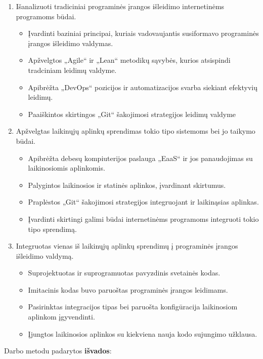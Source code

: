 \documentclass{VUMIFPSkursinis}
\begin{document}
\begin{enumerate}
  \item Išanalizuoti tradiciniai programinės įrangos išleidimo internetinėms programoms būdai.
    \begin{itemize}
      \item Įvardinti baziniai principai, kuriais vadovaujantis susiformavo programinės įrangos išleidimo valdymas.
      \item Apžvelgtos „Agile“ ir „Lean“ metodikų sąvybės, kurios atsispindi tradciniam leidimų valdyme.
      \item Apibrėžta „DevOps“ pozicijos ir automatizacijos svarba siekiant efektyvių leidimų.
      \item Paaiškintos skirtingos „Git“ šakojimosi strategijos leidimų valdyme
    \end{itemize}
  \item Apžvelgtas laikinųjų aplinkų sprendimas tokio tipo sistemoms bei jo taikymo būdai.
    \begin{itemize}
      \item Apibrėžta debesų kompiuterijos paslauga „EaaS“ ir jos panaudojimas su laikinosiomis aplinkomis.
      \item Palygintos laikinosios ir statinės aplinkos, įvardinant skirtumus.
      \item Praplėstos „Git“ šakojimosi strategijos integruojant ir laikinąsias aplinkas.
      \item Įvardinti skirtingi galimi būdai internetinėms programoms integruoti tokio tipo sprendimą.
    \end{itemize}
  \item Integruotas vienas iš laikinųjų aplinkų sprendimų į programinės įrangos išleidimo valdymą.
    \begin{itemize}
      \item Suprojektuotas ir suprogramuotas pavyzdinis svetainės kodas.
      \item Imitacinis kodas buvo paruoštas programinės įrangos leidimams.
      \item Pasirinktas integracijos tipas bei paruošta konfigūracija laikinosiom aplinkom įgyvendinti.
      \item Įjungtos laikinosios aplinkos su kiekviena nauja kodo sujungimo užklausa.
    \end{itemize}
\end{enumerate}

Darbo metodu padarytos \textbf{išvados}:
\end{document}
